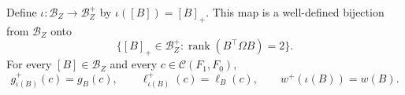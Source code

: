Define \(\iota:\mathcal B_Z\to\mathcal B_Z^+\) by \(\iota([B])=[B]_+\).  This map is a well-defined bijection from \(\mathcal B_Z\) onto
\[
 \{[B]_+\in\mathcal B_Z^+:\operatorname{rank}(B^{\top}\Omega B)=2\}.
\]
For every \([B]\in\mathcal B_Z\) and every \(c\in\mathcal C(F_1,F_0)\),
\[
 g_{\iota(B)}^+(c)=g_B(c),
 \qquad \ell_{\iota(B)}^+(c)=\ell_B(c),
 \qquad w^+(\iota(B))=w(B).
\]